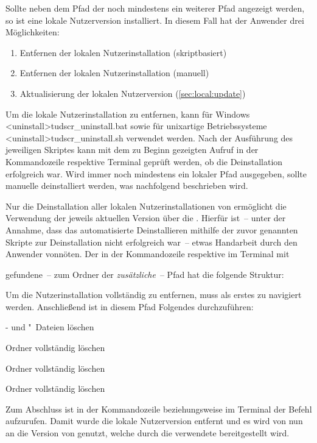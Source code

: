 Sollte neben dem Pfad der \DistributionGeneral noch mindestens ein weiterer 
Pfad angezeigt werden, so ist eine lokale Nutzerversion installiert. In diesem 
Fall hat der Anwender drei Möglichkeiten:
%
\begin{enumerate}
\item Entfernen der lokalen Nutzerinstallation (skriptbasiert)
\item Entfernen der lokalen Nutzerinstallation (manuell)
\item Aktualisierung der lokalen Nutzerversion (\autoref{sec:local:update})
\end{enumerate}
%
Um die lokale Nutzerinstallation zu entfernen, kann für Windows
\GitHubDownload*<uninstall>{tudscr_uninstall.bat} sowie für unixartige 
Betriebssysteme \GitHubDownload*<uninstall>{tudscr_uninstall.sh} verwendet 
werden. Nach der Ausführung des jeweiligen Skriptes kann mit dem zu Beginn 
gezeigten Aufruf in der Kommandozeile respektive Terminal geprüft werden, ob 
die Deinstallation erfolgreich war. Wird immer noch mindestens ein lokaler Pfad 
ausgegeben, sollte \TUDScript manuelle deinstalliert werden, was nachfolgend 
beschrieben wird.

Nur die Deinstallation aller lokalen Nutzerinstallationen von \TUDScript 
ermöglicht die Verwendung der jeweils aktuellen Version über die 
\DistributionGeneral. Hierfür ist~-- unter der Annahme, dass das automatisierte 
Deinstallieren mithilfe der zuvor genannten Skripte zur Deinstallation nicht 
erfolgreich war~-- etwas Handarbeit durch den Anwender vonnöten. Der in der 
Kommandozeile respektive im Terminal mit
%
\begin{quoting}
\end{quoting}
%
gefundene~-- zum Ordner der \DistributionGeneral \emph{zusätzliche}~-- 
Pfad hat die folgende Struktur:
%
\begin{quoting}
\end{quoting}
%
Um die Nutzerinstallation vollständig zu entfernen, muss als erstes zu 
 navigiert werden. Anschließend ist in diesem 
Pfad Folgendes durchzuführen:
%
\settowidth{}%
\begin{description}[labelwidth=\tudscrdim,labelsep=.5em]
\item[\Path{tex/latex/tudscr/}]- und "~Dateien löschen
\item[\Path{tex/latex/tudscr/}]Ordner  vollständig löschen
\item[\Path{doc/latex/}] Ordner  vollständig löschen
\item[\Path{source/latex/}] Ordner  vollständig löschen
\end{description}
%
Zum Abschluss ist in der Kommandozeile beziehungsweise im Terminal der Befehl 
 aufzurufen. Damit wurde die lokale Nutzerversion entfernt und es 
wird von nun an die Version von \TUDScript genutzt, welche durch die verwendete 
\DistributionGeneral bereitgestellt wird.



